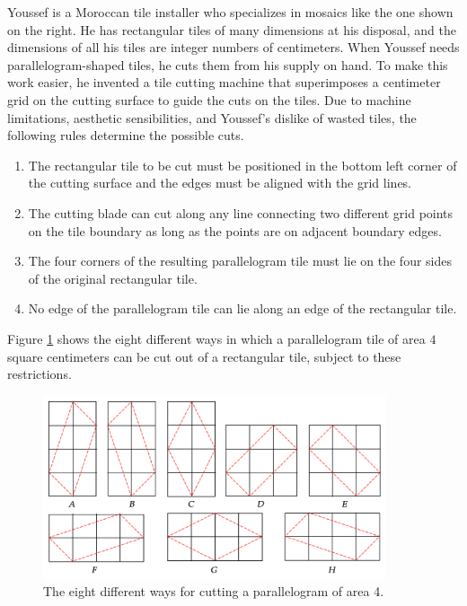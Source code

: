 
%
%
Youssef is a Moroccan tile installer who specializes in mosaics like the one shown on the right. He has rectangular tiles of many dimensions at his disposal, and the dimensions of all his tiles are integer numbers of centimeters. When Youssef needs parallelogram-shaped tiles, he cuts them from his supply on hand. To make this work easier, he invented a tile cutting machine that superimposes a centimeter grid on the cutting surface to guide the cuts on the tiles.
Due to machine limitations, aesthetic sensibilities, and Youssef's dislike of wasted tiles, the following rules determine the possible cuts.

\begin{enumerate}
\setlength{\itemsep}{0.0in}

\item The rectangular tile to be cut must be positioned in the bottom left corner of the cutting surface and the edges must be aligned with the grid lines.

\item The cutting blade can cut along any line connecting two different grid points on the tile boundary as long as the points are on adjacent boundary edges.

\item The four corners of the resulting parallelogram tile must lie on the four sides of the original rectangular tile.

\item No edge of the parallelogram tile can lie along an edge of the rectangular tile.
\end{enumerate}

Figure \ref{fig:tiles2} shows the eight different ways in which a parallelogram tile of area $4$ square centimeters can be cut out of a rectangular tile, subject to these restrictions.

\begin{figure}[!ht]
  \centering
  \includegraphics[width=0.9\textwidth]{tiles-fig2}
  \caption{The eight different ways for cutting a parallelogram of area 4.}
  \label{fig:tiles2}
  \end{figure}

